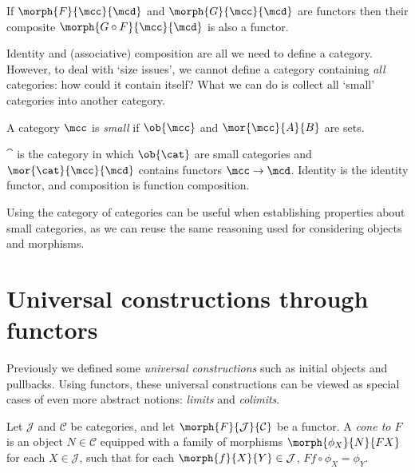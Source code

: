 \begin{example}
    If \(\morph{F}{\mcc}{\mcd}\) and \(\morph{G}{\mcc}{\mcd}\) are functors
    then their composite \(\morph{G \circ F}{\mcc}{\mcd}\) is also a functor.
\end{example}

Identity and (associative) composition are all we need to define a category.
However, to deal with `size issues', we cannot define a category containing
\emph{all} categories: how could it contain itself?
What we can do is collect all `small' categories into another category.

\begin{definition}
    A category \(\mcc\) is \emph{small} if \(\ob{\mcc}\) and
    \(\mor{\mcc}{A}{B}\) are sets.
\end{definition}

\begin{example}
    \(\cat\) is the category in which \(\ob{\cat}\) are small categories and
    \(\mor{\cat}{\mcc}{\mcd}\) contains functors \(\mcc \to \mcd\).
    Identity is the identity functor, and composition is function composition.
\end{example}

Using the category of categories can be useful when establishing properties
about small categories, as we can reuse the same reasoning used for considering
objects and morphisms.

\section{Universal constructions through functors}

Previously we defined some \emph{universal constructions} such as initial
objects and pullbacks.
Using functors, these universal constructions can be viewed as special cases of
even more abstract notions: \emph{limits} and \emph{colimits}.

\begin{definition}[Cone]
    Let \(\mathcal{J}\) and \(\mathcal{C}\) be categories, and let
    \(\morph{F}{\mathcal{J}}{\mathcal{C}}\) be a functor.
    A \emph{cone to \(F\)} is an object \(N \in \mathcal{C}\) equipped with
    a family of morphisms \(\morph{\phi_X}{N}{FX}\) for each
    \(X \in \mathcal{J}\), such that for each
    \(\morph{f}{X}{Y} \in \mathcal{J}\),
    \(Ff \circ \phi_X = \phi_Y\).
    \begin{center}
        
    \end{center}
\end{definition}

